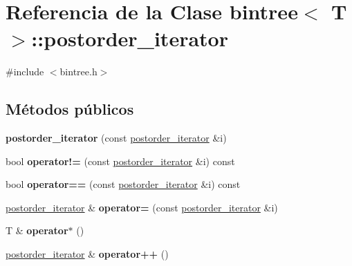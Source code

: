 \hypertarget{classbintree_1_1postorder__iterator}{}\section{Referencia de la Clase bintree$<$ T $>$\+:\+:postorder\+\_\+iterator}
\label{classbintree_1_1postorder__iterator}


{\ttfamily \#include $<$bintree.\+h$>$}

\subsection*{Métodos públicos}
\begin{DoxyCompactItemize}
\item 
{\bfseries postorder\+\_\+iterator} (const \hyperlink{classbintree_1_1postorder__iterator}{postorder\+\_\+iterator} \&i)\hypertarget{classbintree_1_1postorder__iterator_ab833e690df460ec874702031b7ddb8fd}{}\label{classbintree_1_1postorder__iterator_ab833e690df460ec874702031b7ddb8fd}

\item 
bool {\bfseries operator!=} (const \hyperlink{classbintree_1_1postorder__iterator}{postorder\+\_\+iterator} \&i) const \hypertarget{classbintree_1_1postorder__iterator_adbec84d4a2528ef1143f6516a42b9aea}{}\label{classbintree_1_1postorder__iterator_adbec84d4a2528ef1143f6516a42b9aea}

\item 
bool {\bfseries operator==} (const \hyperlink{classbintree_1_1postorder__iterator}{postorder\+\_\+iterator} \&i) const \hypertarget{classbintree_1_1postorder__iterator_a665cd867a17ca543f66b90a9a24f4a04}{}\label{classbintree_1_1postorder__iterator_a665cd867a17ca543f66b90a9a24f4a04}

\item 
\hyperlink{classbintree_1_1postorder__iterator}{postorder\+\_\+iterator} \& {\bfseries operator=} (const \hyperlink{classbintree_1_1postorder__iterator}{postorder\+\_\+iterator} \&i)\hypertarget{classbintree_1_1postorder__iterator_ad8c883f6d5aafb02675e571c4758cf46}{}\label{classbintree_1_1postorder__iterator_ad8c883f6d5aafb02675e571c4758cf46}

\item 
T \& {\bfseries operator$\ast$} ()\hypertarget{classbintree_1_1postorder__iterator_a17c712da51aa46720e2b9da87e0a33ac}{}\label{classbintree_1_1postorder__iterator_a17c712da51aa46720e2b9da87e0a33ac}

\item 
\hyperlink{classbintree_1_1postorder__iterator}{postorder\+\_\+iterator} \& {\bfseries operator++} ()\hypertarget{classbintree_1_1postorder__iterator_a12d7ff6822212e84ac3cdd85f0e7766d}{}\label{classbintree_1_1postorder__iterator_a12d7ff6822212e84ac3cdd85f0e7766d}

\end{DoxyCompactItemize}
